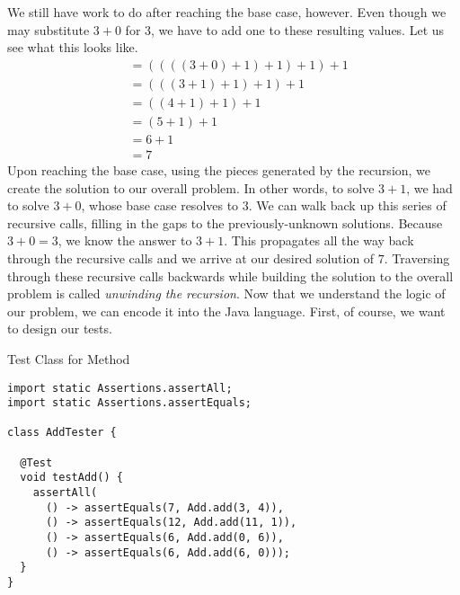 We still have work to do after reaching the base case, however. Even though we may substitute $3+0$ for $3$, we have to add one to these resulting values. Let us see what this looks like.
\begin{align*}
    &= ((((3 + 0) + 1) + 1) + 1) + 1\\
    &= (((3 + 1) + 1) + 1) + 1\\
    &= ((4 + 1) + 1) + 1\\
    &= (5 + 1) + 1\\
    &= 6 + 1\\
    &= 7
\end{align*}
Upon reaching the base case, using the pieces generated by the recursion, we create the solution to our overall problem. In other words, to solve $3 + 1$, we had to solve $3 + 0$, whose base case resolves to $3$. We can walk back up this series of recursive calls, filling in the gaps to the previously-unknown solutions. Because $3 + 0 = 3$, we know the answer to $3 + 1$. This propagates all the way back through the recursive calls and we arrive at our desired solution of $7$. Traversing through these recursive calls backwards while building the solution to the overall problem is called \textit{unwinding the recursion}. Now that we understand the logic of our problem, we can encode it into the Java language. First, of course, we want to design our tests.

\begin{cl}[]{Test Class for  Method}
\begin{lstlisting}[language=MyJava]
import static Assertions.assertAll;
import static Assertions.assertEquals;

class AddTester {
  
  @Test
  void testAdd() {
    assertAll(
      () -> assertEquals(7, Add.add(3, 4)),
      () -> assertEquals(12, Add.add(11, 1)),
      () -> assertEquals(6, Add.add(0, 6)),
      () -> assertEquals(6, Add.add(6, 0)));
  }
}
\end{lstlisting}
\end{cl}

